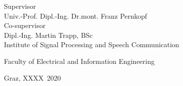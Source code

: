 \begin{titlingpage}
\begin{center}
\vfill\vfill\vfill
\vfill\vfill\vfill

Supervisor\\
Univ.-Prof. Dipl.-Ing. Dr.\thinspace{}mont. Franz Pernkopf\\
\vfill
Co-supervisor\\
Dipl.-Ing. Martin Trapp, BSc\\
\vfill
\vfill
Institute of Signal Processing and Speech Communication\\

\vfill

Faculty of Electrical and Information Engineering

\vfill\vfill\vfill

{\scriptsize Graz, XXXX~2020}

\end{center}
\end{titlingpage}

